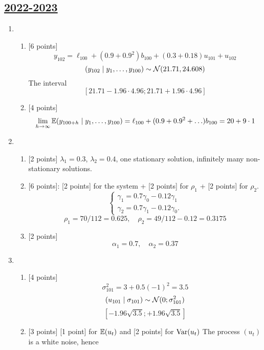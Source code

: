\subsection[2022-2023]{\hyperref[sec:kr_03_2022_2023]{2022-2023}}
\label{sec:sol_kr_03_2022_2023} %

\begin{enumerate}
    \item 
\begin{enumerate}
    \item {[6 points]}
    \[
        y_{102}= \ell_{100} + (0.9 + 0.9^2) b_{100} + (0.3 + 0.18)u_{101} + u_{102}    
        \]
        \[
        (y_{102} \mid y_1, \ldots, y_{100}) \sim \mathcal{N}(21.71, 24.608)    
        \]
        The interval
        \[
        [21.71 - 1.96 \cdot 4.96;21.71 + 1.96 \cdot 4.96]    
        \]
    \item {[4 points]}
    \[
    \lim_{h\to\infty} \operatorname{\mathbb{E}}(y_{100+h} \mid y_1, \ldots, y_{100}) = \ell_{100} + (0.9 + 0.9^2 +\ldots) b_{100} = 20 + 9\cdot 1    
    \]    
\end{enumerate}
\item 
\begin{enumerate}
    \item {[2 points]} $\lambda_1 = 0.3$, $\lambda_2 = 0.4$, one stationary solution, infinitely many non-stationary solutions. 
    \item {[6 points]}: {[2 points] for the system} + {[2 points] for $\rho_1$} + {[2 points] for $\rho_2$}.
    \[
        \begin{cases}
            \gamma_1 = 0.7 \gamma_0  - 0.12 \gamma_1 \\
            \gamma_2 = 0.7 \gamma_1 - 0.12 \gamma_0. 
        \end{cases}
    \]
    \[
    \rho_1 = 70/112 = 0.625, \quad \rho_2 = 49/112 - 0.12 = 0.3175    
    \]
    \item {[2 points]}
    \[
    \alpha_1 = 0.7, \quad \alpha_2 = 0.37    
    \]
\end{enumerate}
\item 
\begin{enumerate}
    \item {[4 points]}
    \[
    \sigma^2_{101} = 3 + 0.5 (-1)^2= 3.5    
    \]
    \[
    (u_{101}\mid \sigma_{101}) \sim \mathcal{N}(0; \sigma^2_{101})    
    \]
    \[
    [-1.96 \sqrt{3.5}; +1.96 \sqrt{3.5}]    
    \]
    \item {[3 points]} {[1 point]} for $\operatorname{\mathbb{E}}(u_t)$ and {[2 points]} for $\operatorname{Var}(u_t)$ 
    The process $(u_t)$ is a white noise, hence

\end{enumerate}
\end{enumerate}
